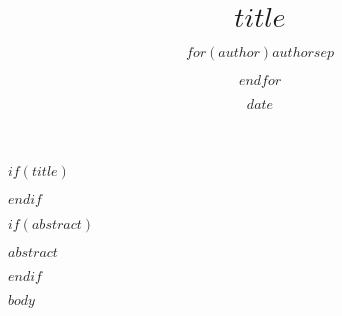 \documentclass[nofonts]{tufte-handout}
\title{$title$}
\author{$for(author)$$author$$sep$ \and $endfor$}
\date{$date$}
\begin{document}
$if(title)$
\maketitle
$endif$

$if(abstract)$
\begin{fullwidth}
    \vskip10pt
    \hfill\textsf{$abstract$}
\end{fullwidth}
$endif$

$body$
\end{document}
